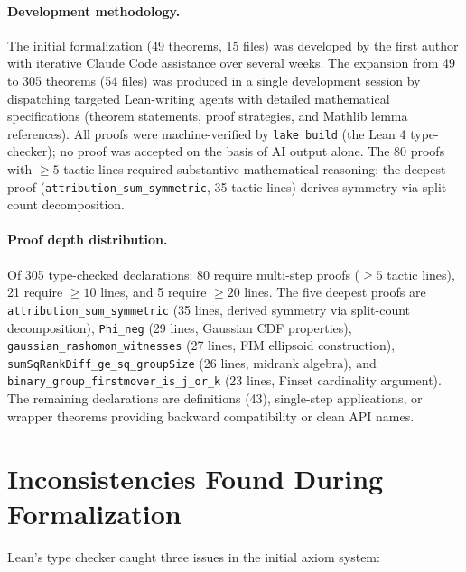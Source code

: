 \documentclass{article}
\begin{document}
\paragraph{Development methodology.}
The initial formalization (49 theorems, 15 files) was developed by
the first author with iterative Claude Code assistance over several
weeks. The expansion from 49 to 305 theorems (54 files) was produced
in a single development session by dispatching targeted Lean-writing
agents with detailed mathematical specifications (theorem statements,
proof strategies, and Mathlib lemma references). All proofs were
machine-verified by \texttt{lake build} (the Lean 4 type-checker);
no proof was accepted on the basis of AI output alone. The 80 proofs
with ${\geq}5$ tactic lines required substantive mathematical
reasoning; the deepest proof (\texttt{attribution\_sum\_symmetric},
35 tactic lines) derives symmetry via split-count decomposition.

\paragraph{Proof depth distribution.}
Of 305 type-checked declarations: 80 require multi-step proofs
(${\geq}5$ tactic lines), 21 require ${\geq}10$ lines, and 5
require ${\geq}20$ lines. The five deepest proofs are
\texttt{attribution\_sum\_symmetric} (35 lines, derived symmetry
via split-count decomposition), \texttt{Phi\_neg} (29 lines,
Gaussian CDF properties), \texttt{gaussian\_rashomon\_witnesses}
(27 lines, FIM ellipsoid construction),
\texttt{sumSqRankDiff\_ge\_sq\_groupSize} (26 lines, midrank
algebra), and \texttt{binary\_group\_firstmover\_is\_j\_or\_k}
(23 lines, Finset cardinality argument). The remaining declarations
are definitions (43), single-step applications, or wrapper theorems
providing backward compatibility or clean API names.

\section{Inconsistencies Found During Formalization}

Lean's type checker caught three issues in the initial axiom system:
\end{document}
